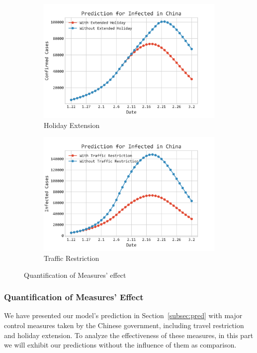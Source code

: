 \documentclass[12pt]{mcmthesis}
\begin{document}
\begin{figure}[H]
    \centering
    \begin{subfigure}[b]{0.48\textwidth}
        \includegraphics[width=\textwidth]{figure/China_Total_Holiday_Comp.png}
        \caption{\small{Holiday Extension}}
        \label{fig:Holidaay}
    \end{subfigure}%
    \begin{subfigure}[b]{0.48\textwidth}
        \includegraphics[width=\textwidth]{figure/Prediction_Without_Traf_Rest.png}
        \caption{\small{Traffic Restriction}}
        \label{fig:Traf_Rest}
    \end{subfigure}
    \caption{Quantification of Measures' effect}\label{fig:Measures}
\end{figure}

\subsubsection{Quantification of Measures' Effect}
    We have presented our model's prediction in Section~\ref{subsec:pred} with major control measures taken by the Chinese government, including travel restriction and holiday extension. To analyze the effectiveness of these measures, in this part we will exhibit our predictions without the influence of them as comparison.
    
\end{document}

